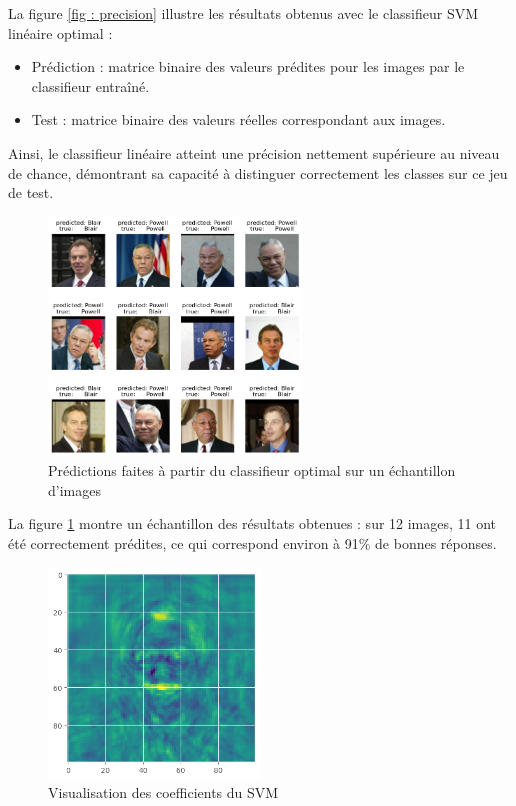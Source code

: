 \documentclass[a4paper,12pt]{article}
\begin{document}
La figure \ref{fig : precision} illustre les résultats obtenus avec le classifieur SVM linéaire optimal : 
\begin{itemize}
    \item Prédiction : matrice binaire des valeurs prédites pour les images par le classifieur entraîné.
    \item Test : matrice binaire des valeurs réelles correspondant aux images.
\end{itemize}

Ainsi, le classifieur linéaire atteint une précision nettement supérieure au niveau de chance, démontrant sa capacité à distinguer correctement les classes sur ce jeu de test.

\begin{figure}[H]
    \centering
    \includegraphics[width=0.6\textwidth]{Images/prediction_visage.png}
    \caption{Prédictions faites à partir du classifieur optimal sur un échantillon d'images}\label{fig:predict}
\end{figure}

La figure \ref{fig:predict} montre un échantillon des résultats obtenues : sur 12 images, 11 ont été correctement prédites, ce qui correspond environ à 91\% de bonnes réponses.

\begin{figure}[H]
    \centering
    \includegraphics[width=0.5\textwidth]{Images/coeff_visage.png}
    \caption{Visualisation des coefficients du SVM}\label{fig : ?}
\end{figure}
\end{document}
